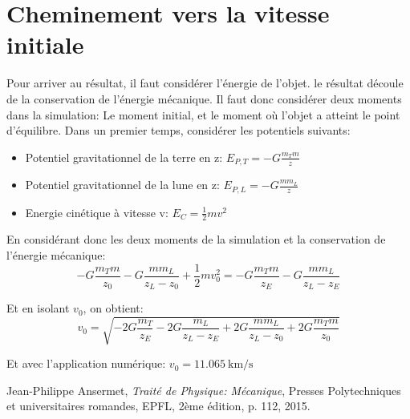\documentclass[a4paper,12pt,twoside]{article}
\begin{document}
\section{Cheminement vers la vitesse initiale}
\label{ann:vit-init}
Pour arriver au résultat, il faut considérer l'énergie de l'objet.
le résultat découle de la conservation de l'énergie mécanique.
Il faut donc considérer deux moments dans la simulation: Le moment initial, et le moment où l'objet a atteint le point d'équilibre.
Dans un premier temps, considérer les potentiels suivants:
\begin{itemize}
	\item Potentiel gravitationnel de la terre en z: $E_{P,T} = -G\frac{m_T m}{z}$
	\item Potentiel gravitationnel de la lune en z: $E_{P,L} = -G\frac{m m_L}{z}$
	\item Energie cinétique à vitesse v: $E_C = \frac{1}{2}mv^2$
\end{itemize}

En considérant donc les deux moments de la simulation et la conservation de l'énergie mécanique:
\begin{equation}
	-G\frac{m_T m}{z_0} - G\frac{m m_L}{z_L - z_0} + \frac{1}{2}mv_0^2 = -G\frac{m_T m}{z_E} - G\frac{m m_L}{z_L - z_E}
\end{equation}

Et en isolant $v_0$, on obtient:
\begin{equation}
v_0 = \sqrt{-2G\frac{m_T}{z_E} - 2G\frac{m_L}{z_L - z_E} + 2G\frac{m m_L}{z_L - z_0} + 2G\frac{m_T m}{z_0}}
\end{equation}

Et avec l'application numérique: $v_0 = \SI{11.065}{\kilo\meter\per\second}$


\begin{thebibliography}{99}

	Jean-Philippe Ansermet,
	\textit{Traité de Physique: Mécanique},
	Presses Polytechniques et universitaires romandes, EPFL,
	2ème édition,
	p. 112,
	2015.


\end{thebibliography}
\end{document}

